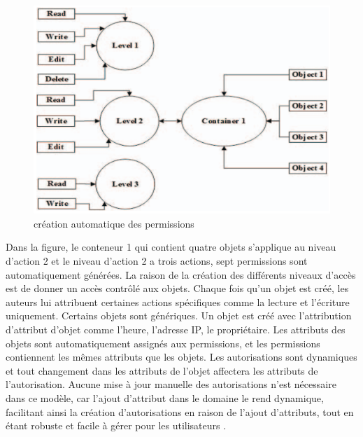 \begin{figure}[h!]
    \centering
		\includegraphics[scale=0.7]{chap2/images/permissionauto.png}
    \caption{création automatique des permissions}
	 \label{figCreationAutoPer}
\end{figure}

Dans la figure, le conteneur 1 qui contient quatre objets s'applique au niveau d'action 2 et le niveau d'action 2 a trois actions, sept permissions sont automatiquement générées. La raison de la création des différents niveaux d'accès est de donner un accès contrôlé aux objets. Chaque fois qu'un objet est créé, les auteurs lui attribuent certaines actions spécifiques comme la lecture et l'écriture uniquement. Certains objets sont génériques. Un objet est créé avec l'attribution d'attribut d'objet comme l'heure, l'adresse IP, le propriétaire. Les attributs des objets sont automatiquement assignés aux permissions, et les permissions contiennent les mêmes attributs que les objets. Les autorisations sont dynamiques et tout changement dans les attributs de l'objet affectera les attributs de l'autorisation. Aucune mise à jour manuelle des autorisations n'est nécessaire dans ce modèle, car l'ajout d'attribut dans le domaine le rend dynamique, facilitant ainsi la création d'autorisations en raison de l'ajout d'attributs, tout en étant robuste et facile à gérer pour les utilisateurs .

